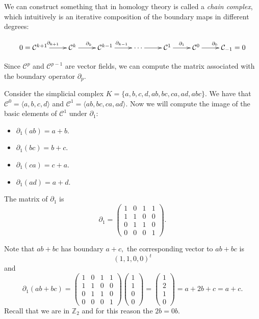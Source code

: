 \documentclass[
	fontsize=10pt, %
	twoside=false, %
	secnumdepth=1, %
]{kaobook}
\newcommand{\Z}{\mathbb{Z}}
\begin{document}
We can construct something that in homology theory is called a \emph{chain complex}, which intuitively is an iterative composition of the boundary maps in different degrees:

\begin{equation}
\xymatrix{
0=\mathcal{C}^{k+1}\ar[r]^{\partial_{k+1}}& \mathcal{C}^k\ar[r]^{\partial_k} & \mathcal{C}^{k-1}\ar[r]^{\partial_{k-1}} & \cdots \ar[r] & \mathcal{C}^1 \ar[r]^{\partial_1} & \mathcal{C}^0 \ar[r]^{\partial_0} & \mathcal{C}_{-1}=0
}
\end{equation}

Since $\mathcal{C}^p$ and $\mathcal{C}^{p-1}$ are vector fields, we can compute the matrix associated with the boundary operator $\partial_p.$

\begin{example}
    Consider the simplicial complex $K=\{a,b,c,d, ab, bc, ca, ad, abc\}.$ We have that $\mathcal{C}^0=\langle a,b,c,d\rangle$ and $\mathcal{C}^1=\langle ab,bc,ca,ad\rangle.$ Now we will compute the image of the basic elements of $\mathcal{C}^1$ under $\partial_1:$
    \begin{itemize}
        \item $\partial_1(ab)=a+b.$
        \item $\partial_1(bc)=b+c.$
        \item $\partial_1(ca)=c+a.$
        \item $\partial_1(ad)=a+d.$
    \end{itemize}
    The matrix of $\partial_1$ is $$\partial_1=\left(\begin{array}{cccc} 
    1 & 0 & 1 & 1 \\
    1 & 1 & 0 & 0 \\
    0 & 1 & 1 & 0 \\
    0 & 0 & 0 & 1
    \end{array}\right).$$

    Note that $ab+bc$ has boundary $a+c,$ the corresponding vector to $ab+bc$ is $$(1,1,0,0)^t$$ and $$\partial_1(ab+bc)=\left(\begin{array}{cccc} 
    1 & 0 & 1 & 1 \\
    1 & 1 & 0 & 0 \\
    0 & 1 & 1 & 0 \\
    0 & 0 & 0 & 1
    \end{array}\right)\left(\begin{array}{c} 1 \\ 1\\ 0 \\ 0\end{array}\right)=\left(\begin{array}{c} 1 \\ 2 \\ 1 \\ 0 \end{array}\right)=a+2b+c=a+c.$$
    Recall that we are in $\Z_2$ and for this reason the $2b=0b.$ 
\end{example}
\end{document}
